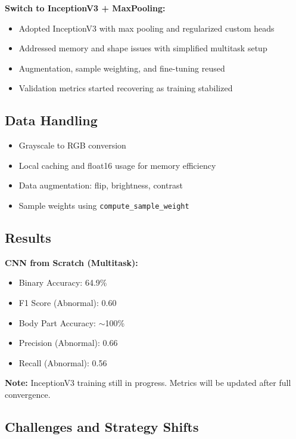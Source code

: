 \documentclass[11pt]{article}
\begin{document}
\textbf{Switch to InceptionV3 + MaxPooling:}
\begin{itemize}
    \item Adopted InceptionV3 with max pooling and regularized custom heads
    \item Addressed memory and shape issues with simplified multitask setup
    \item Augmentation, sample weighting, and fine-tuning reused
    \item Validation metrics started recovering as training stabilized
\end{itemize}

\subsection*{Data Handling}
\begin{itemize}
    \item Grayscale to RGB conversion
    \item Local caching and float16 usage for memory efficiency
    \item Data augmentation: flip, brightness, contrast
    \item Sample weights using \texttt{compute\_sample\_weight}
\end{itemize}

\subsection*{Results}

\textbf{CNN from Scratch (Multitask):}
\begin{itemize}
    \item Binary Accuracy: 64.9\%
    \item F1 Score (Abnormal): 0.60
    \item Body Part Accuracy: $\sim$100\%
    \item Precision (Abnormal): 0.66
    \item Recall (Abnormal): 0.56
\end{itemize}

\vspace{1em}
\noindent\textbf{Note:} InceptionV3 training still in progress. Metrics will be updated after full convergence.

\subsection*{Challenges and Strategy Shifts}
\end{document}
